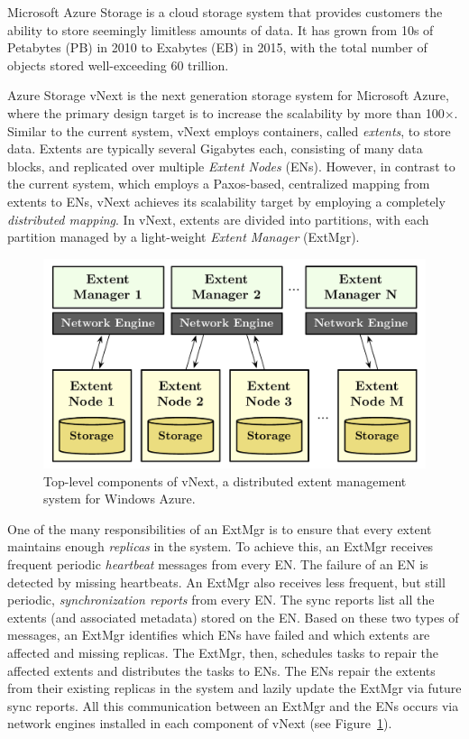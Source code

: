 Microsoft Azure Storage is a cloud storage system that provides customers the ability to store seemingly limitless amounts of data. It has grown from 10s of Petabytes (PB) in 2010 to Exabytes (EB) in 2015, with the total number of objects stored well-exceeding 60 trillion.

Azure Storage vNext is the next generation storage system for Microsoft Azure, where the primary design target is to increase the scalability by more than 100$\times$. Similar to the current system, vNext employs containers, called {\em extents}, to store data. Extents are typically several Gigabytes each, consisting of many data blocks, and replicated over multiple {\em Extent Nodes} (ENs). However, in contrast to the current system, which employs a Paxos-based, centralized mapping from extents to ENs, vNext achieves its scalability target by employing a completely \emph{distributed mapping}. In vNext, extents are divided into partitions, with each partition managed by a light-weight {\em Extent Manager} (ExtMgr).

\begin{figure}[t]
\centering
\includegraphics[width=\linewidth]{img/azurestore}
\caption{Top-level components of vNext, a distributed extent management system for Windows Azure.}
\label{fig:vnext}
\end{figure}

One of the many responsibilities of an ExtMgr is to ensure that every extent maintains enough \emph{replicas} in the system. To achieve this, an ExtMgr receives frequent periodic \emph{heartbeat} messages from every EN. The failure of an EN is detected by missing heartbeats. An ExtMgr also receives less frequent, but still periodic, {\em synchronization reports} from every EN. The sync reports list all the extents (and associated metadata) stored on the EN. Based on these two types of messages, an ExtMgr identifies which ENs have failed and which extents are affected and missing replicas. The ExtMgr, then, schedules tasks to repair the affected extents and distributes the tasks to ENs. The ENs repair the extents from their existing replicas in the system and lazily update the ExtMgr via future sync reports. All this communication between an ExtMgr and the ENs occurs via network engines installed in each component of vNext (see Figure~\ref{fig:vnext}).

